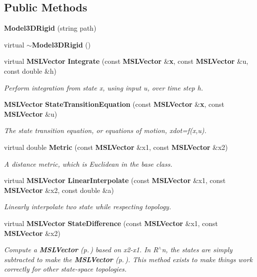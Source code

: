 \subsection*{Public Methods}
\begin{CompactItemize}
\item 
{\bf Model3DRigid} (string path)
\item 
virtual {\bf $\sim$Model3DRigid} ()
\item 
virtual {\bf MSLVector} {\bf Integrate} (const {\bf MSLVector} \&{\bf x}, const {\bf MSLVector} \&u, const double \&h)
\begin{CompactList}\small\item\em Perform integration from state x, using input u, over time step h.\item\end{CompactList}\item 
{\bf MSLVector} {\bf State\-Transition\-Equation} (const {\bf MSLVector} \&{\bf x}, const {\bf MSLVector} \&u)
\begin{CompactList}\small\item\em The state transition equation, or equations of motion, xdot=f(x,u).\item\end{CompactList}\item 
virtual double {\bf Metric} (const {\bf MSLVector} \&x1, const {\bf MSLVector} \&x2)
\begin{CompactList}\small\item\em A distance metric, which is Euclidean in the base class.\item\end{CompactList}\item 
virtual {\bf MSLVector} {\bf Linear\-Interpolate} (const {\bf MSLVector} \&x1, const {\bf MSLVector} \&x2, const double \&a)
\begin{CompactList}\small\item\em Linearly interpolate two state while respecting topology.\item\end{CompactList}\item 
virtual {\bf MSLVector} {\bf State\-Difference} (const {\bf MSLVector} \&x1, const {\bf MSLVector} \&x2)
\begin{CompactList}\small\item\em Compute a {\bf MSLVector} {\rm (p.\,\pageref{classMSLVector})} based on x2-x1. In R$^\wedge$n, the states are simply subtracted to make the {\bf MSLVector} {\rm (p.\,\pageref{classMSLVector})}. This method exists to make things work correctly for other state-space topologies.\item\end{CompactList}\end{CompactItemize}


